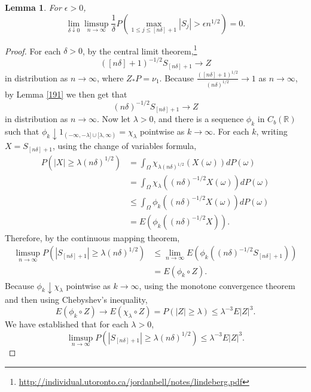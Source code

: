 \documentclass{article}
\newtheorem{lemma}[theorem]{Lemma}
\theoremstyle{definition}
\begin{document}
\begin{lemma}
For $\epsilon>0$,
\[
\lim_{\delta \downarrow 0} \limsup_{n \to \infty} \frac{1}{\delta} P\left(\max_{1 \leq j \leq [n\delta]+1} |S_j| > \epsilon n^{1/2} \right)=0.
\]
\label{lemma418}
\end{lemma}
\begin{proof}
For each $\delta>0$, by the central limit theorem,\footnote{\url{http://individual.utoronto.ca/jordanbell/notes/lindeberg.pdf}}
\[
([n\delta]+1)^{-1/2} S_{[n\delta]+1} \to Z
\]
in distribution as $n \to \infty$, where $Z_*P=\nu_1$.  Because $\frac{([n\delta]+1)^{1/2}}{(n\delta)^{1/2}} \to 1$ as $n \to \infty$, by Lemma \ref{191} we then
get that
\[
(n\delta)^{-1/2} S_{[n\delta]+1} \to Z
\]
in distribution as $n \to \infty$.
Now let $\lambda>0$, and there is a sequence $\phi_k$ in $C_b(\mathbb{R})$ such that
$\phi_k \downarrow 1_{(-\infty,-\lambda] \cup [\lambda,\infty)}=\chi_\lambda$ pointwise as $k \to \infty$. 
For each $k$, writing $X=S_{[n\delta]+1}$, using the change of variables formula,
\begin{align*}
P(|X| \geq \lambda (n\delta)^{1/2})
&=
\int_\Omega 
 \chi_{\lambda (n\delta)^{1/2}}(X(\omega)) dP(\omega)\\
 & = 
\int_\Omega \chi_{\lambda}((n\delta)^{-1/2} X(\omega)) dP(\omega)\\
&\leq \int_\Omega \phi_k((n\delta)^{-1/2} X(\omega)) dP(\omega)\\
&=E(\phi_k((n\delta)^{-1/2}X)).
\end{align*}
Therefore, by the continuous mapping theorem,
\begin{align*}
\limsup_{n \to \infty} P(|S_{[n\delta]+1}| \geq \lambda (n\delta)^{1/2})&\leq \lim_{n \to \infty} E(\phi_k((n\delta)^{-1/2}S_{[n\delta]+1}))\\
&=E(\phi_k \circ Z).
\end{align*}
Because $\phi_k \downarrow \chi_\lambda$ pointwise as $k \to \infty$, using the monotone convergence theorem and then using Chebyshev's inequality,
\[
E(\phi_k \circ Z) \to E(\chi_\lambda \circ Z) =  P(|Z| \geq \lambda) \leq \lambda^{-3} E|Z|^3.
\]
We have established that for each $\lambda>0$,
\begin{equation}
\limsup_{n \to \infty} P(|S_{[n\delta]+1}| \geq \lambda (n\delta)^{1/2}) \leq  \lambda^{-3} E|Z|^3.
\label{412}
\end{equation}


\end{proof}
\end{document}
